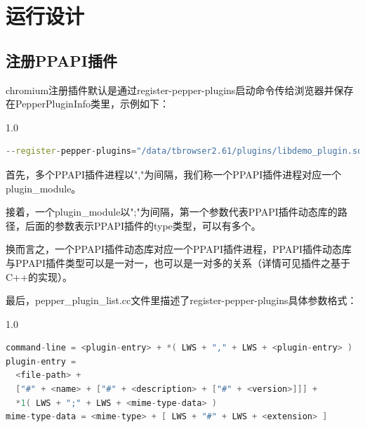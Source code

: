 
\section{运行设计}
\subsection{注册PPAPI插件}
chromium注册插件默认是通过register-pepper-plugins启动命令传给浏览器并保存在PepperPluginInfo类里，示例如下：\\
\begin{spacing}{1.0}
\begin{lstlisting}[language={C++}]
--register-pepper-plugins="/data/tbrowser2.61/plugins/libdemo_plugin.so;application/demo_plugin;application/demo_plugin1,/data/tbrowser2.61/plugins/libutil.so;application/util"
\end{lstlisting}
\end{spacing}
首先，多个PPAPI插件进程以","为间隔，我们称一个PPAPI插件进程对应一个plugin\_module。\par
接着，一个plugin\_module以";"为间隔，第一个参数代表PPAPI插件动态库的路径，后面的参数表示PPAPI插件的type类型，可以有多个。 \par
换而言之，一个PPAPI插件动态库对应一个PPAPI插件进程，PPAPI插件动态库与PPAPI插件类型可以是一对一，也可以是一对多的关系（详情可见插件之基于C++的实现）。\par
最后，pepper\_plugin\_list.cc文件里描述了register-pepper-plugins具体参数格式：
\begin{spacing}{1.0}
\begin{lstlisting}[language={C++}]
command-line = <plugin-entry> + *( LWS + "," + LWS + <plugin-entry> ) 
plugin-entry =
  <file-path> +
  ["#" + <name> + ["#" + <description> + ["#" + <version>]]] +
  *1( LWS + ";" + LWS + <mime-type-data> )
mime-type-data = <mime-type> + [ LWS + "#" + LWS + <extension> ]
\end{lstlisting}
\end{spacing}


